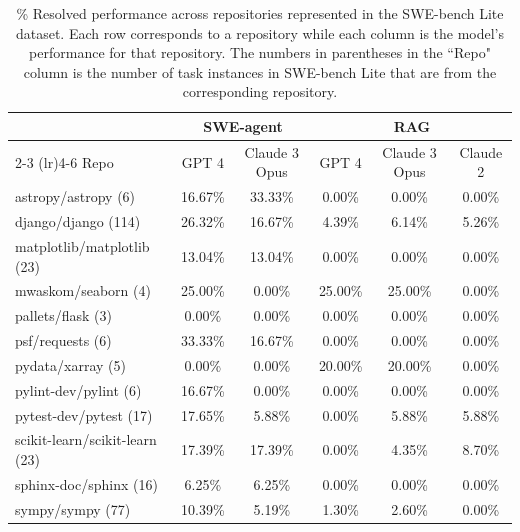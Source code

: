 \begin{table}[ht]
\caption{
\% Resolved performance across repositories represented in the SWE-bench Lite dataset.
Each row corresponds to a repository while each column is the model's performance for that repository.
The numbers in parentheses in the ``Repo" column is the number of task instances in SWE-bench Lite that are from the corresponding repository.
}
\label{table.results_by_repo}
\vspace{0.25em}
\centering
\begin{tabular}{lccccc}
    \toprule
         & \multicolumn{2}{c}{SWE-agent} & \multicolumn{3}{c}{RAG} \\
           \cmidrule(lr){2-3} \cmidrule(lr){4-6}
    Repo & GPT 4 & Claude 3 Opus & GPT 4  & Claude 3 Opus & Claude 2\\
    \midrule
        astropy/astropy (6) & 16.67\% & 33.33\% & \phantom{0}0.00\% & \phantom{0}0.00\% & 0.00\% \\
        django/django (114) & 26.32\% & 16.67\% & \phantom{0}4.39\% & \phantom{0}6.14\% & 5.26\% \\
        matplotlib/matplotlib (23) & 13.04\% & 13.04\% & \phantom{0}0.00\% & \phantom{0}0.00\% & 0.00\% \\
        mwaskom/seaborn (4) & 25.00\% & \phantom{0}0.00\% & 25.00\% & 25.00\% & 0.00\% \\
        pallets/flask (3) & \phantom{0}0.00\% & \phantom{0}0.00\% & \phantom{0}0.00\% & \phantom{0}0.00\% & 0.00\% \\
        psf/requests (6) & 33.33\% & 16.67\% & \phantom{0}0.00\% & \phantom{0}0.00\% & 0.00\% \\
        pydata/xarray (5) & \phantom{0}0.00\% & \phantom{0}0.00\% & 20.00\% & 20.00\% & 0.00\% \\
        pylint-dev/pylint (6) & 16.67\% & \phantom{0}0.00\% & \phantom{0}0.00\% & \phantom{0}0.00\% & 0.00\% \\
        pytest-dev/pytest (17) & 17.65\% & \phantom{0}5.88\% & \phantom{0}0.00\% & \phantom{0}5.88\% & 5.88\% \\
        scikit-learn/scikit-learn (23) & 17.39\% & 17.39\% & \phantom{0}0.00\% & \phantom{0}4.35\% & 8.70\% \\
        sphinx-doc/sphinx (16) & \phantom{0}6.25\% & \phantom{0}6.25\% & \phantom{0}0.00\% & \phantom{0}0.00\% & 0.00\% \\
        sympy/sympy (77) & 10.39\% & \phantom{0}5.19\% & \phantom{0}1.30\% & \phantom{0}2.60\% & 0.00\% \\
    \bottomrule
\end{tabular}
\end{table}